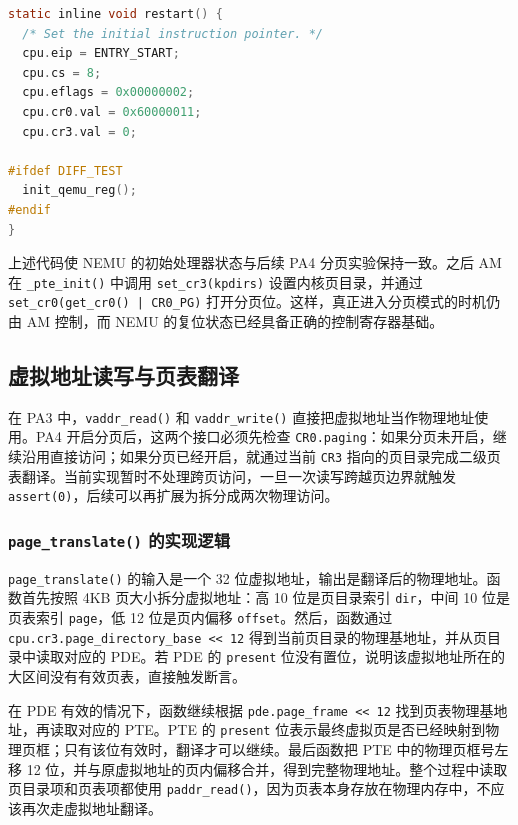 \begin{lstlisting}[language=C,caption={\texttt{restart()} 中初始化 CR0/CR3},frame=single]
static inline void restart() {
  /* Set the initial instruction pointer. */
  cpu.eip = ENTRY_START;
  cpu.cs = 8;
  cpu.eflags = 0x00000002;
  cpu.cr0.val = 0x60000011;
  cpu.cr3.val = 0;

#ifdef DIFF_TEST
  init_qemu_reg();
#endif
}
\end{lstlisting}

上述代码使 NEMU 的初始处理器状态与后续 PA4 分页实验保持一致。之后 AM 在 \texttt{\_pte\_init()} 中调用 \texttt{set\_cr3(kpdirs)} 设置内核页目录，并通过 \texttt{set\_cr0(get\_cr0() | CR0\_PG)} 打开分页位。这样，真正进入分页模式的时机仍由 AM 控制，而 NEMU 的复位状态已经具备正确的控制寄存器基础。

\subsection{虚拟地址读写与页表翻译}

在 PA3 中，\texttt{vaddr\_read()} 和 \texttt{vaddr\_write()} 直接把虚拟地址当作物理地址使用。PA4 开启分页后，这两个接口必须先检查 \texttt{CR0.paging}：如果分页未开启，继续沿用直接访问；如果分页已经开启，就通过当前 \texttt{CR3} 指向的页目录完成二级页表翻译。当前实现暂时不处理跨页访问，一旦一次读写跨越页边界就触发 \texttt{assert(0)}，后续可以再扩展为拆分成两次物理访问。

\subsubsection*{\texttt{page\_translate()} 的实现逻辑}

\texttt{page\_translate()} 的输入是一个 32 位虚拟地址，输出是翻译后的物理地址。函数首先按照 4KB 页大小拆分虚拟地址：高 10 位是页目录索引 \texttt{dir}，中间 10 位是页表索引 \texttt{page}，低 12 位是页内偏移 \texttt{offset}。然后，函数通过 \texttt{cpu.cr3.page\_directory\_base << 12} 得到当前页目录的物理基地址，并从页目录中读取对应的 PDE。若 PDE 的 \texttt{present} 位没有置位，说明该虚拟地址所在的大区间没有有效页表，直接触发断言。

在 PDE 有效的情况下，函数继续根据 \texttt{pde.page\_frame << 12} 找到页表物理基地址，再读取对应的 PTE。PTE 的 \texttt{present} 位表示最终虚拟页是否已经映射到物理页框；只有该位有效时，翻译才可以继续。最后函数把 PTE 中的物理页框号左移 12 位，并与原虚拟地址的页内偏移合并，得到完整物理地址。整个过程中读取页目录项和页表项都使用 \texttt{paddr\_read()}，因为页表本身存放在物理内存中，不应该再次走虚拟地址翻译。

